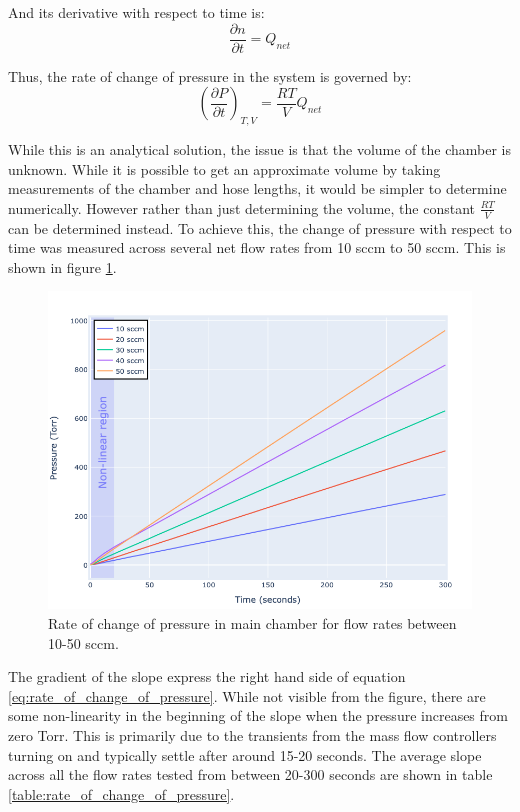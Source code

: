 And its derivative with respect to time is:
\begin{equation}
    \frac{\partial n}{\partial t} = Q_{net}
\end{equation}

Thus, the rate of change of pressure in the system is governed by:
\begin{equation}
    \left( \frac{\partial P}{\partial t} \right)_{T,V}  = \frac{RT}{V} Q_{net}
    \label{eq:rate_of_change_of_pressure}
\end{equation}

While this is an analytical solution, the issue is that the volume of the chamber is unknown. While it is possible to get an approximate volume by taking measurements of the chamber and hose lengths, it would be simpler to determine numerically. However rather than just determining the volume, the constant $\frac{RT}{V}$ can be determined instead. To achieve this, the change of pressure with respect to time was measured across several net flow rates from 10 sccm to 50 sccm. This is shown in figure \ref{fig:rate_of_change_of_presure}.

\begin{figure}[h!]
	\centering
	\includegraphics[width=\linewidth]{chapter_5/figures/rate_of_change_of_pressure.png}
	\caption{Rate of change of pressure in main chamber for flow rates between 10-50 sccm.}
	\label{fig:rate_of_change_of_presure}
\end{figure}

The gradient of the slope express the right hand side of equation \ref{eq:rate_of_change_of_pressure}. While not visible from the figure, there are some non-linearity in the beginning of the slope when the pressure increases from zero Torr. This is primarily due to the transients from the mass flow controllers turning on and typically settle after around 15-20 seconds. The average slope across all the flow rates tested from between 20-300 seconds are shown in table \ref{table:rate_of_change_of_pressure}.

